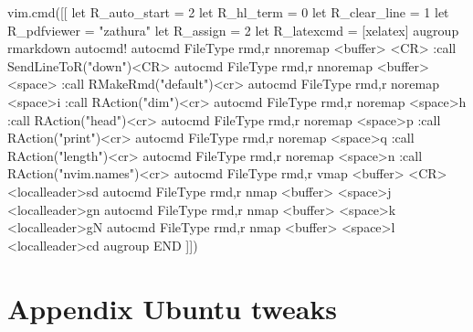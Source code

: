\documentclass[
  letterpaper,
  DIV=11,
  numbers=noendperiod,
  oneside]{scrartcl}
\newenvironment{Shaded}{\begin{snugshade}}{\end{snugshade}}
\newcommand{\BuiltInTok}[1]{\textcolor[rgb]{0.00,0.23,0.31}{#1}}
\newcommand{\DecValTok}[1]{\textcolor[rgb]{0.68,0.00,0.00}{#1}}
\newcommand{\ErrorTok}[1]{\textcolor[rgb]{0.68,0.00,0.00}{#1}}
\newcommand{\ExtensionTok}[1]{\textcolor[rgb]{0.00,0.23,0.31}{#1}}
\newcommand{\KeywordTok}[1]{\textcolor[rgb]{0.00,0.23,0.31}{#1}}
\newcommand{\NormalTok}[1]{\textcolor[rgb]{0.00,0.23,0.31}{#1}}
\newcommand{\OperatorTok}[1]{\textcolor[rgb]{0.37,0.37,0.37}{#1}}
\newcommand{\StringTok}[1]{\textcolor[rgb]{0.13,0.47,0.30}{#1}}
\newcommand{\VariableTok}[1]{\textcolor[rgb]{0.07,0.07,0.07}{#1}}
\begin{document}
\begin{Shaded}
\begin{Highlighting}[]

\ExtensionTok{vim.cmd}\ErrorTok{(}\KeywordTok{[[}
\NormalTok{let R\_auto\_start = }\ErrorTok{2}
\BuiltInTok{let} \VariableTok{R\_hl\_term} \OperatorTok{=} \DecValTok{0}
\BuiltInTok{let} \VariableTok{R\_clear\_line} \OperatorTok{=} \DecValTok{1}
\BuiltInTok{let} \VariableTok{R\_pdfviewer} \OperatorTok{=} \StringTok{"zathura"} 
\BuiltInTok{let} \VariableTok{R\_assign} \OperatorTok{=} \DecValTok{2}
\BuiltInTok{let} \VariableTok{R\_latexcmd} \OperatorTok{=} \OperatorTok{[}\StringTok{\textquotesingle{}xelatex\textquotesingle{}}\OperatorTok{]}
\ExtensionTok{augroup}\NormalTok{ rmarkdown}
\ExtensionTok{autocmd!}
\ExtensionTok{autocmd}\NormalTok{ FileType rmd,r nnoremap }\OperatorTok{\textless{}}\NormalTok{buffer}\OperatorTok{\textgreater{}} \OperatorTok{\textless{}}\NormalTok{CR}\OperatorTok{\textgreater{}}\NormalTok{  :call SendLineToR}\ErrorTok{(}\StringTok{"down"}\KeywordTok{)}\OperatorTok{\textless{}}\NormalTok{CR}\OperatorTok{\textgreater{}}
\ExtensionTok{autocmd}\NormalTok{ FileType rmd,r nnoremap }\OperatorTok{\textless{}}\NormalTok{buffer}\OperatorTok{\textgreater{}} \OperatorTok{\textless{}}\NormalTok{space}\OperatorTok{\textgreater{}}\StringTok{\textquotesingle{} :call RMakeRmd("default")\textless{}cr\textgreater{}}
\StringTok{autocmd FileType rmd,r noremap \textless{}space\textgreater{}i :call RAction("dim")\textless{}cr\textgreater{}}
\StringTok{autocmd FileType rmd,r noremap \textless{}space\textgreater{}h :call RAction("head")\textless{}cr\textgreater{}}
\StringTok{autocmd FileType rmd,r noremap \textless{}space\textgreater{}p :call RAction("print")\textless{}cr\textgreater{}}
\StringTok{autocmd FileType rmd,r noremap \textless{}space\textgreater{}q :call RAction("length")\textless{}cr\textgreater{}}
\StringTok{autocmd FileType rmd,r noremap \textless{}space\textgreater{}n :call RAction("nvim.names")\textless{}cr\textgreater{}}
\StringTok{autocmd FileType rmd,r vmap \textless{}buffer\textgreater{} \textless{}CR\textgreater{} \textless{}localleader\textgreater{}sd}
\StringTok{autocmd FileType rmd,r nmap \textless{}buffer\textgreater{} \textless{}space\textgreater{}j \textless{}localleader\textgreater{}gn}
\StringTok{autocmd FileType rmd,r nmap \textless{}buffer\textgreater{} \textless{}space\textgreater{}k \textless{}localleader\textgreater{}gN}
\StringTok{autocmd FileType rmd,r nmap \textless{}buffer\textgreater{} \textless{}space\textgreater{}l \textless{}localleader\textgreater{}cd}
\StringTok{augroup END}
\StringTok{]])}
\end{Highlighting}
\end{Shaded}

\hypertarget{appendix-ubuntu-tweaks}{%
\section{Appendix Ubuntu tweaks}\label{appendix-ubuntu-tweaks}}
\end{document}
